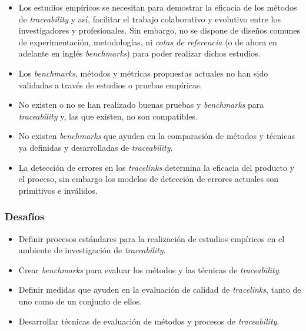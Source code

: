 \documentclass[a4paper,12pt,oneside,spanish]{book}
\begin{document}
\begin{itemize}[label={$\times$}]

\item Los estudios empíricos se necesitan para demostrar la eficacia de los métodos de \textit{traceability} y así, facilitar el trabajo colaborativo y evolutivo entre los investigadores y profesionales. Sin embargo, no se dispone de diseños comunes de experimentación, metodologías, ni \textit{cotas de referencia} (o de ahora en adelante en inglés \textit{benchmarks}) para poder realizar dichos estudios.

\item Los \textit{benchmarks}, métodos y métricas propuestas actuales no han sido validadas a través de estudios o pruebas empíricas.

\item No existen o no se han realizado buenas pruebas y \textit{benchmarks} para \textit{traceability} y, las que existen, no son compatibles. 

\item No existen \textit{benchmarks} que ayuden en la comparación de métodos y técnicas ya definidas y desarrolladas de \textit{traceability}.

\item La detección de errores en los \textit{tracelinks} determina la eficacia del producto y el proceso, sin embargo los modelos de detección de errores actuales son primitivos e inválidos.

\end{itemize}

\subsubsection{Desafíos}

\begin{itemize}[label={\checkmark}]

\item Definir procesos estándares para la realización de estudios empíricos en el ambiente de investigación de \textit{traceability}.

\item Crear \textit{benchmarks} para evaluar los métodos y las técnicas de \textit{traceability}.

\item Definir medidas que ayuden en la evaluación de calidad de \textit{tracelinks}, tanto de uno como de un conjunto de ellos.

\item Desarrollar técnicas de evaluación de métodos y procesos de \textit{traceability}.

\end{itemize}
\end{document}
